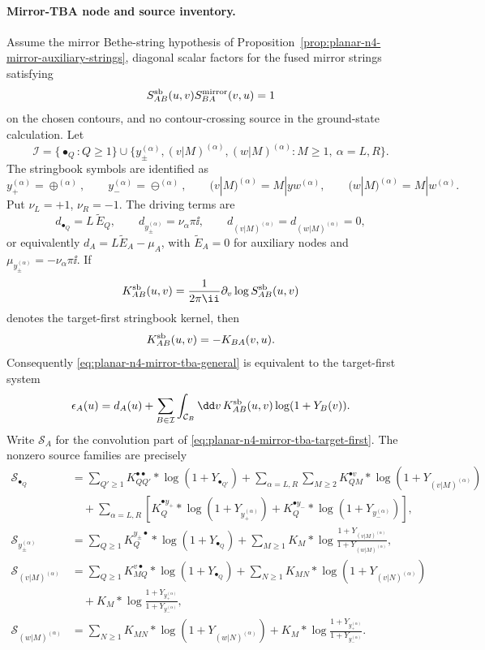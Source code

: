 \paragraph{Mirror-TBA node and source inventory.}
Assume the mirror Bethe-string hypothesis of
Proposition~\ref{prop:planar-n4-mirror-auxiliary-strings}, diagonal scalar
factors for the fused mirror strings satisfying
\[
  S^{\rm sb}_{AB}(u,v)S^{\rm mirror}_{BA}(v,u)=1
\]
on the chosen contours, and no contour-crossing source in the ground-state
calculation.  Let
\[
  \mathcal I
  =
  \{\bullet_Q:Q\geq1\}
  \cup
  \{y_\pm^{(\alpha)},(v|M)^{(\alpha)},(w|M)^{(\alpha)}:
       M\geq1,\ \alpha=L,R\}.
\]
The stringbook symbols are identified as
\[
  y_+^{(\alpha)}=\oplus^{(\alpha)},\qquad
  y_-^{(\alpha)}=\ominus^{(\alpha)},\qquad
  (v|M)^{(\alpha)}=M|yw^{(\alpha)},\qquad
  (w|M)^{(\alpha)}=M|w^{(\alpha)}.
\]
Put \(\nu_L=+1\), \(\nu_R=-1\).  The driving terms are
\[
  d_{\bullet_Q}=L\,\widetilde E_Q,\qquad
  d_{y_\pm^{(\alpha)}}=\nu_\alpha\pi\ii,\qquad
  d_{(v|M)^{(\alpha)}}=d_{(w|M)^{(\alpha)}}=0,
\]
or equivalently \(d_A=L\widetilde E_A-\mu_A\), with
\(\widetilde E_A=0\) for auxiliary nodes and
\(\mu_{y_\pm^{(\alpha)}}=-\nu_\alpha\pi\ii\).  If
\[
  K^{\rm sb}_{AB}(u,v)
  =
  \frac{1}{2\pi\ii}\partial_v\log S^{\rm sb}_{AB}(u,v)
\]
denotes the target-first stringbook kernel, then
\begin{equation}
  K^{\rm sb}_{AB}(u,v)=-K_{BA}(v,u).
  \label{eq:planar-n4-stringbook-source-kernel-bridge}
\end{equation}
Consequently \eqref{eq:planar-n4-mirror-tba-general} is equivalent to the
target-first system
\begin{equation}
  \epsilon_A(u)
  =
  d_A(u)
  +
  \sum_{B\in\mathcal I}
  \int_{\mathcal C_B}\dd v\,
  K^{\rm sb}_{AB}(u,v)\log(1+Y_B(v)).
  \label{eq:planar-n4-mirror-tba-target-first}
\end{equation}
Write \(\mathcal S_A\) for the convolution part of
\eqref{eq:planar-n4-mirror-tba-target-first}.  The nonzero source families
are precisely
\begin{align*}
  \mathcal S_{\bullet_Q}
  &=
  \sum_{Q'\geq1}K^{\bullet\bullet}_{QQ'}*\log(1+Y_{\bullet_{Q'}})
  +
  \sum_{\alpha=L,R}\sum_{M\geq2}
    K^{\bullet v}_{QM}*\log(1+Y_{(v|M)^{(\alpha)}})
  \\
  &\quad
  +
  \sum_{\alpha=L,R}
  \left[
    K^{\bullet y_+}_{Q}*\log(1+Y_{y_+^{(\alpha)}})
    +
    K^{\bullet y_-}_{Q}*\log(1+Y_{y_-^{(\alpha)}})
  \right]
  ,
  \\
  \mathcal S_{y_\pm^{(\alpha)}}
  &=
  \sum_{Q\geq1}K^{y_\pm\bullet}_{Q}*\log(1+Y_{\bullet_Q})
  +
  \sum_{M\geq1}K_M*
  \log\frac{1+Y_{(v|M)^{(\alpha)}}}
           {1+Y_{(w|M)^{(\alpha)}}}
  ,
  \\
  \mathcal S_{(v|M)^{(\alpha)}}
  &=
  \sum_{Q\geq1}K^{v\bullet}_{MQ}*\log(1+Y_{\bullet_Q})
  +
  \sum_{N\geq1}K_{MN}*\log(1+Y_{(v|N)^{(\alpha)}})
  \\
  &\quad
  +
  K_M*\log\frac{1+Y_{y_+^{(\alpha)}}}
                 {1+Y_{y_-^{(\alpha)}}}
  ,
  \\
  \mathcal S_{(w|M)^{(\alpha)}}
  &=
  \sum_{N\geq1}K_{MN}*\log(1+Y_{(w|N)^{(\alpha)}})
  +
  K_M*\log\frac{1+Y_{y_+^{(\alpha)}}}
                 {1+Y_{y_-^{(\alpha)}}}.
\end{align*}
